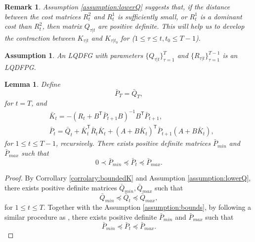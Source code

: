 \documentclass{article}
\newcommand{\transpose}{\mathsf{T}}
\newtheorem{lemma}{Lemma}
\newtheorem{assumption}{Assumption}
\newtheorem{remark}{Remark}
\begin{document}
\begin{remark}
    Assumption \ref{assumption:lowerQ} suggests that, if the distance between the cost matrices $R_{t}^{2}$ and $R_{t}^{1}$ is sufficiently small, or $R_{t}^{1}$ is a dominant cost than $R_{t}^{2}$, then matrix $Q_{\tau|t}$ are positive definite. This will help us to develop the contraction between $K_{\tau|t}$ and $K_{\tau|t_{0}}$ for ($1\leq \tau \leq t,t_{0} \leq T-1$).
\end{remark}
\begin{assumption}
    An LQDFG with parameters $\{Q_{\tau|t}\}_{\tau=1}^{T}$ and $\{R_{\tau|t}\}_{\tau=1}^{T-1}$ is an LQDFPG.
\end{assumption}
\begin{lemma}\label{lemma:boundedP}
    Define
    \begin{equation}
        \bar{P}_{T} = \bar{Q}_{T},
    \end{equation}
    for $t = T$, and 
    \begin{equation}
    \begin{split}
        &\bar{K}_{t} = -(R_{t}+ B^{\transpose}\bar{P}_{t+1}B)^{-1}B^{\transpose}\bar{P}_{t+1},\\
        &\bar{P}_{t} = \bar{Q}_{t} + \bar{K}_{t}^{\transpose}\bar{R}_{t}\bar{K}_{t} + (A+B\bar{K}_{t})^{\transpose}\bar{P}_{t+1}(A+B\bar{K}_{t}),
    \end{split}
    \end{equation}
    for $1\leq t \leq T-1$, recursively. There exists positive definite matrices $\bar{P}_{min}$ and $\bar{P}_{max}$ such that
    \begin{equation}
        0 \prec \bar{P}_{min} \preceq \bar{P}_{t} \preceq \bar{P}_{max}.
    \end{equation}
\end{lemma}
\begin{proof}
    By Corrollary \ref{corrolary:boundedK} and Assumption \ref{assumption:lowerQ}, there exists positive definite matrices $\bar{Q}_{min},\bar{Q}_{max}$ such that
    \begin{equation}
        \bar{Q}_{min} \preceq \bar{Q}_{t} \preceq \bar{Q}_{max},
    \end{equation}
    for $1\leq t \leq T$.
    Together with the Assumption \ref{assumption:bounds}, by following a similar procedure as \cite[Proposition 11.]{zhang_regret_2021}, there exists positive definite $\bar{P}_{min}$ and $\bar{P}_{max}$ such that
    \begin{equation*}
        \bar{P}_{min} \preceq \bar{P}_{t} \preceq \bar{P}_{max}.
    \end{equation*}
\end{proof}
\end{document}
